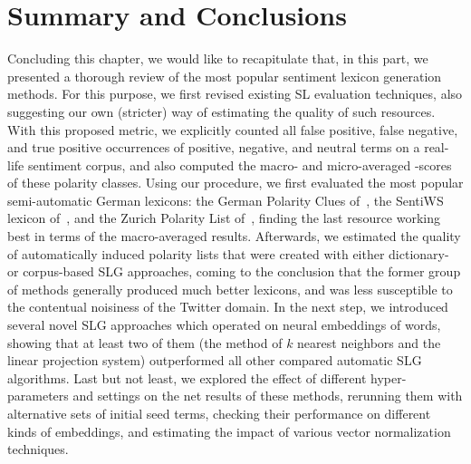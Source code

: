 \section{Summary and Conclusions}

Concluding this chapter, we would like to recapitulate that, in this
part, we presented a thorough review of the most popular sentiment
lexicon generation methods.  For this purpose, we first revised
existing SL evaluation techniques, also suggesting our own (stricter)
way of estimating the quality of such resources.  With this proposed
metric, we explicitly counted all false positive, false negative, and
true positive occurrences of positive, negative, and neutral terms on
a real-life sentiment corpus, and also computed the macro- and
micro-averaged \F-scores of these polarity classes.  Using our
procedure, we first evaluated the most popular semi-automatic German
lexicons: the German Polarity Clues of~\citet{Waltinger:10}, the
SentiWS lexicon of~\citet{Remus:10}, and the Zurich Polarity List
of~\citet{Clematide:10}, finding the last resource working best in
terms of the macro-averaged results.  Afterwards, we estimated the
quality of automatically induced polarity lists that were created with
either dictionary- or corpus-based SLG approaches, coming to the
conclusion that the former group of methods generally produced much
better lexicons, and was less susceptible to the contentual noisiness
of the Twitter domain.  In the next step, we introduced several novel
SLG approaches which operated on neural embeddings of words, showing
that at least two of them (the method of $k$ nearest neighbors and the
linear projection system) outperformed all other compared automatic
SLG algorithms.  Last but not least, we explored the effect of
different hyper-parameters and settings on the net results of these
methods, rerunning them with alternative sets of initial seed terms,
checking their performance on different kinds of embeddings, and
estimating the impact of various vector normalization techniques.

